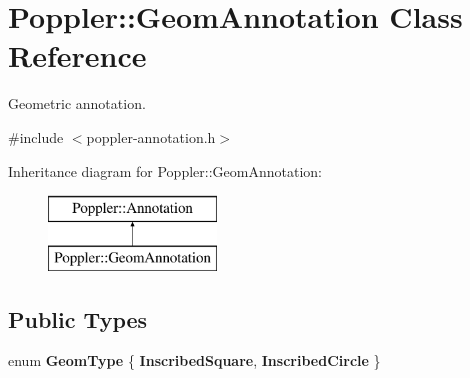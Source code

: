 \hypertarget{class_poppler_1_1_geom_annotation}{}\section{Poppler\+:\+:Geom\+Annotation Class Reference}
\label{class_poppler_1_1_geom_annotation}


Geometric annotation.  




{\ttfamily \#include $<$poppler-\/annotation.\+h$>$}

Inheritance diagram for Poppler\+:\+:Geom\+Annotation\+:\begin{figure}[H]
\begin{center}
\leavevmode
\includegraphics[height=2.000000cm]{class_poppler_1_1_geom_annotation}
\end{center}
\end{figure}
\subsection*{Public Types}
\begin{DoxyCompactItemize}
\item 
\mbox{\label{class_poppler_1_1_geom_annotation_a8bb14a6f9781c0cbdb55e0a29dfeb3b8}} 
enum {\bfseries Geom\+Type} \{ {\bfseries Inscribed\+Square}, 
{\bfseries Inscribed\+Circle}
 \}
\end{DoxyCompactItemize}
